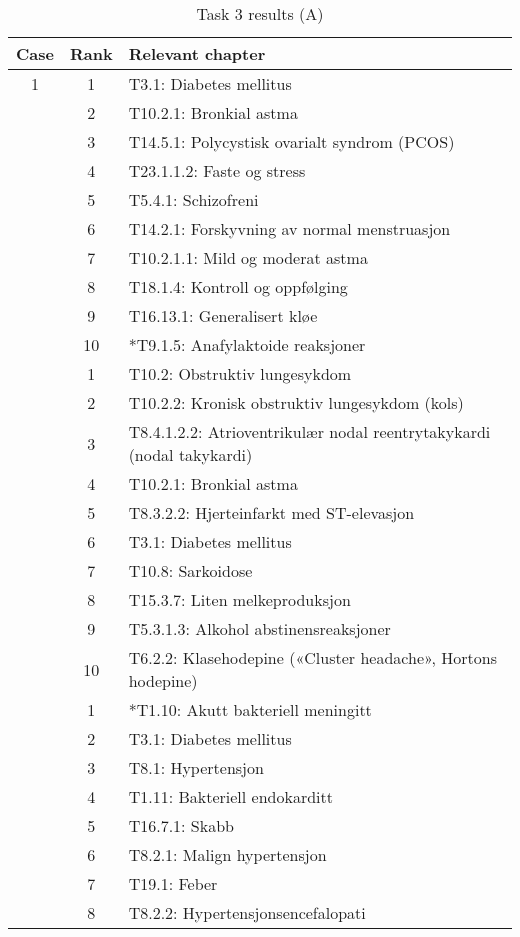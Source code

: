 \documentclass[a4paper, 11pt]{article}
\begin{document}
\begin{table}[htbp] \footnotesize \center
\caption{Task 3 results (A)\label{tab:task3a}}
\begin{tabular}{c c l}
    \toprule
    Case & Rank & Relevant chapter \\
    \midrule
	1 & 1 & T3.1: Diabetes mellitus \\
	 & 2 & T10.2.1: Bronkial astma \\
	 & 3 & T14.5.1: Polycystisk ovarialt syndrom (PCOS) \\
	 & 4 & T23.1.1.2: Faste og stress \\
	 & 5 & T5.4.1: Schizofreni \\
	 & 6 & T14.2.1: Forskyvning av normal menstruasjon \\
	 & 7 & T10.2.1.1: Mild og moderat astma \\
	 & 8 & T18.1.4: Kontroll og oppfølging \\
	 & 9 & T16.13.1: Generalisert kløe \\
	 & 10 & *T9.1.5: Anafylaktoide reaksjoner \\
	\addlinespace
	2 & 1 & T10.2: Obstruktiv lungesykdom \\
	 & 2 & T10.2.2: Kronisk obstruktiv lungesykdom (kols) \\
	 & 3 & T8.4.1.2.2: Atrioventrikulær nodal reentrytakykardi (nodal takykardi) \\
	 & 4 & T10.2.1: Bronkial astma \\
	 & 5 & T8.3.2.2: Hjerteinfarkt med ST-elevasjon \\
	 & 6 & T3.1: Diabetes mellitus \\
	 & 7 & T10.8: Sarkoidose \\
	 & 8 & T15.3.7: Liten melkeproduksjon \\
	 & 9 & T5.3.1.3: Alkohol abstinensreaksjoner \\
	 & 10 & T6.2.2: Klasehodepine («Cluster headache», Hortons hodepine) \\
	\addlinespace
	3 & 1 & *T1.10: Akutt bakteriell meningitt \\
	 & 2 & T3.1: Diabetes mellitus \\
	 & 3 & T8.1: Hypertensjon \\
	 & 4 & T1.11: Bakteriell endokarditt \\
	 & 5 & T16.7.1: Skabb \\
	 & 6 & T8.2.1: Malign hypertensjon \\
	 & 7 & T19.1: Feber \\
	 & 8 & T8.2.2: Hypertensjonsencefalopati \\

\end{tabular}
\end{table}
\end{document}

